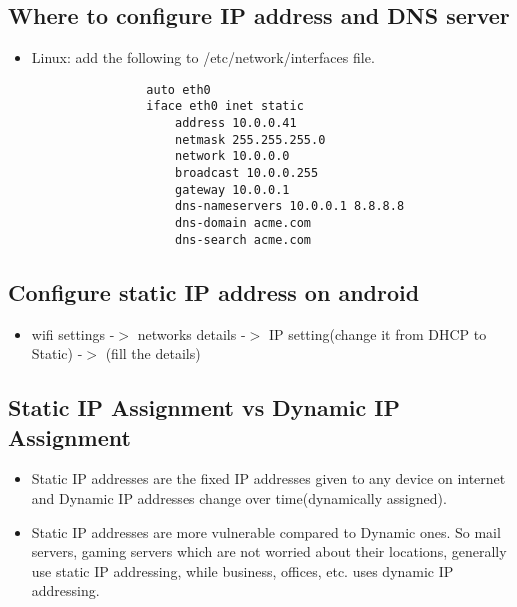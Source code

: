 \documentclass{article}
\begin{document}
\subsection{Where to configure IP address and DNS server}
    \begin{itemize}
        \item Linux: add the following to /etc/network/interfaces file.
            \begin{lstlisting}    
                auto eth0
                iface eth0 inet static    
                    address 10.0.0.41
                    netmask 255.255.255.0
                    network 10.0.0.0
                    broadcast 10.0.0.255
                    gateway 10.0.0.1
                    dns-nameservers 10.0.0.1 8.8.8.8
                    dns-domain acme.com
                    dns-search acme.com
            \end{lstlisting}
    \end{itemize}{}
\subsection{Configure static IP address on android}
    \begin{itemize}
        \item wifi settings -$>$ networks details -$>$ IP setting(change it from DHCP to Static) -$>$ (fill the details)
    \end{itemize}
\subsection{Static IP Assignment vs Dynamic IP Assignment}
    \begin{itemize}
        \item Static IP addresses are the fixed IP addresses given to any device on internet and Dynamic IP addresses change over time(dynamically assigned).
        \item Static IP addresses are more vulnerable compared to Dynamic ones. So mail servers, gaming servers which are not worried about their locations, generally use static IP addressing, while business, offices, etc. uses dynamic IP addressing.
    \end{itemize}
\end{document}
